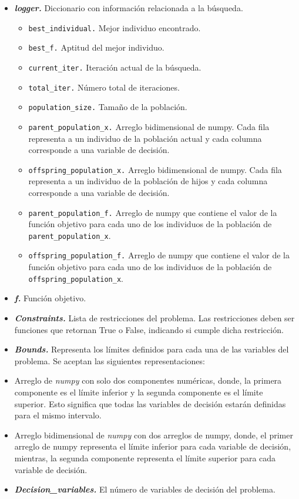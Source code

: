 \documentclass[11pt]{article}
\providecommand{\tightlist}{%
      \setlength{\itemsep}{0pt}\setlength{\parskip}{0pt}}
\begin{document}
\begin{itemize}
\item
  \emph{\textbf{logger.}} Diccionario con información relacionada a la
  búsqueda.

  \begin{itemize}
  \tightlist
  \item
    \texttt{best\_individual.} Mejor individuo encontrado.
  \item
    \texttt{best\_f.} Aptitud del mejor individuo.
  \item
    \texttt{current\_iter.} Iteración actual de la búsqueda.
  \item
    \texttt{total\_iter.} Número total de iteraciones.
  \item
    \texttt{population\_size.} Tamaño de la población.
  \item
    \texttt{parent\_population\_x.} Arreglo bidimensional de numpy. Cada
    fila representa a un individuo de la población actual y cada columna
    corresponde a una variable de decisión.
  \item
    \texttt{offspring\_population\_x.} Arreglo bidimensional de numpy.
    Cada fila representa a un individuo de la población de hijos y cada
    columna corresponde a una variable de decisión.
  \item
    \texttt{parent\_population\_f.} Arreglo de numpy que contiene el
    valor de la función objetivo para cada uno de los individuos de la
    población de \texttt{parent\_population\_x}.
  \item
    \texttt{offspring\_population\_f.} Arreglo de numpy que contiene el
    valor de la función objetivo para cada uno de los individuos de la
    población de \texttt{offspring\_population\_x}.
  \end{itemize}
\item
  \emph{\textbf{f.}} Función objetivo.
\item
  \emph{\textbf{Constraints.}} Lista de restricciones del problema. Las
  restricciones deben ser funciones que retornan True o False, indicando
  si cumple dicha restricción.
\item
  \emph{\textbf{Bounds.}} Representa los límites definidos para cada una
  de las variables del problema. Se aceptan las siguientes
  representaciones:
\item
  Arreglo de \emph{numpy} con solo dos componentes numéricas, donde, la
  primera componente es el límite inferior y la segunda componente es el
  límite superior. Esto significa que todas las variables de decisión
  estarán definidas para el mismo intervalo.
\item
  Arreglo bidimensional de \emph{numpy} con dos arreglos de numpy,
  donde, el primer arreglo de numpy representa el límite inferior para
  cada variable de decisión, mientras, la segunda componente representa
  el límite superior para cada variable de decisión.
\item
  \emph{\textbf{Decision\_variables.}} El número de variables de
  decisión del problema.
\end{itemize}
\end{document}
